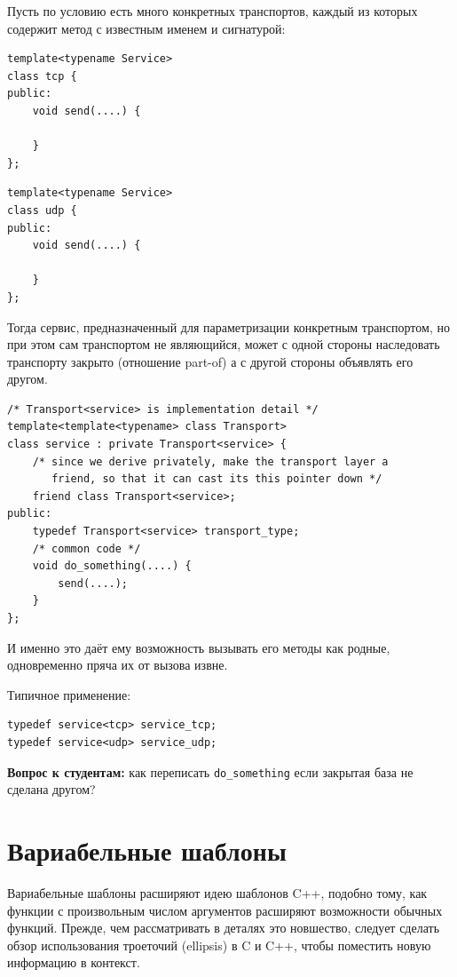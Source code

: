 \documentclass[a4paper,12pt,oneside]{book}
\newif\ifanswers
\begin{document}
Пусть по условию есть много конкретных транспортов, каждый из которых содержит метод с известным именем и сигнатурой:

\begin{lstlisting}
template<typename Service>
class tcp {
public:
    void send(....) {

    }
};
\end{lstlisting}

\begin{lstlisting}
template<typename Service>
class udp {
public:
    void send(....) {

    }
};
\end{lstlisting}

Тогда сервис, предназначенный для параметризации конкретным транспортом, но при этом сам транспортом не являющийся, может с одной стороны наследовать транспорту закрыто (отношение part-of) а с другой стороны объявлять его другом.

\begin{lstlisting}
/* Transport<service> is implementation detail */
template<template<typename> class Transport>
class service : private Transport<service> {
    /* since we derive privately, make the transport layer a 
       friend, so that it can cast its this pointer down */
    friend class Transport<service>;
public:
    typedef Transport<service> transport_type;
    /* common code */
    void do_something(....) { 
        send(....);
    }
};
\end{lstlisting}

И именно это даёт ему возможность вызывать его методы как родные, одновременно пряча их от вызова извне.

Типичное применение:

\begin{lstlisting}
typedef service<tcp> service_tcp;
typedef service<udp> service_udp;
\end{lstlisting}

\textbf{Вопрос к студентам:} как переписать \lstinline!do_something! если закрытая база не сделана другом?

\ifanswers
Как вариант: \lstinline!transport_type::send(....);!
\fi

\pagebreak
\section{Вариабельные шаблоны}\label{VariadicTemplates}

Вариабельные шаблоны расширяют идею шаблонов C++, подобно тому, как функции с произвольным числом аргументов расширяют возможности обычных функций. Прежде, чем рассматривать в деталях это новшество, следует сделать обзор использования троеточий (ellipsis) в C и C++, чтобы поместить новую информацию в контекст.
\end{document}
